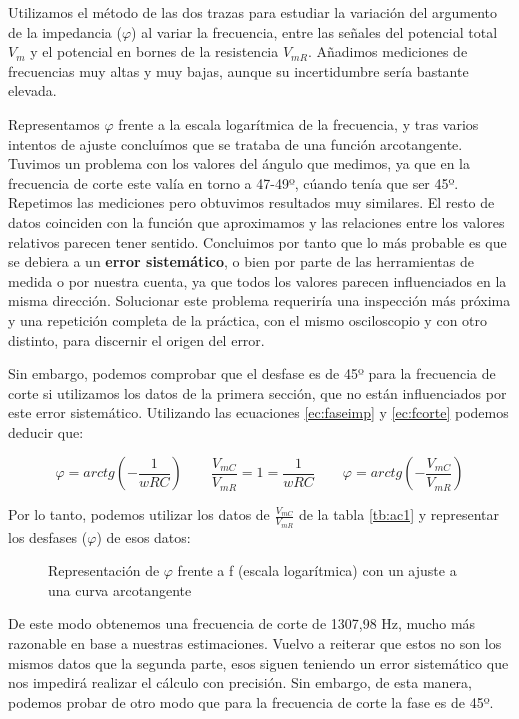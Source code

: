 \documentclass[12pt, a4paper, titlepage]{article}
\begin{document}
  Utilizamos el método de las dos trazas para estudiar la variación del argumento de la impedancia ($\varphi$) al variar la frecuencia, entre las señales del potencial total $V_m$ y el potencial en bornes de la resistencia $V_{mR}$. Añadimos mediciones de frecuencias muy altas y muy bajas, aunque su incertidumbre sería bastante elevada.

  Representamos $\varphi$ frente a la escala logarítmica de la frecuencia, y tras varios intentos de ajuste concluímos que se trataba de una función arcotangente. Tuvimos un problema con los valores del ángulo que medimos, ya que en la frecuencia de corte este valía en torno a 47-49º, cúando tenía que ser 45º. Repetimos las mediciones pero obtuvimos resultados muy similares. El resto de datos coinciden con la función que aproximamos y las relaciones entre los valores relativos parecen tener sentido. Concluimos por tanto que lo más probable es que se debiera a un \textbf{error sistemático}, o bien por parte de las herramientas de medida o por nuestra cuenta, ya que todos los valores parecen influenciados en la misma dirección. Solucionar este problema requeriría una inspección más próxima y una repetición completa de la práctica, con el mismo osciloscopio y con otro distinto, para discernir el origen del error.

  Sin embargo, podemos comprobar que el desfase es de 45º para la frecuencia de corte si utilizamos los datos de la primera sección, que no están influenciados por este error sistemático. Utilizando las ecuaciones \ref{ec:faseimp} y \ref{ec:fcorte} podemos deducir que:

  \begin{equation}
    \varphi = arctg\left(-\frac{1}{wRC}\right) \qquad \frac{V_{mC}}{V_{mR}} = 1 = \frac{1}{wRC} \qquad \varphi = arctg\left(-\frac{V_{mC}}{{V_{mR}}}\right) \nonumber
  \end{equation}

  Por lo tanto, podemos utilizar los datos de $\frac{V_{mC}}{V_{mR}}$ de la tabla \ref{tb:ac1} y representar los desfases ($\varphi$) de esos datos:

  \begin{figure}[H]
    \hspace{2.5em} 
    \caption{Representación de $\varphi$ frente a f (escala logarítmica) con un ajuste a una curva arcotangente}
  \end{figure}

  De este modo obtenemos una frecuencia de corte de 1307,98 Hz, mucho más razonable en base a nuestras estimaciones. Vuelvo a reiterar que estos no son los mismos datos que la segunda parte, esos siguen teniendo un error sistemático que nos impedirá realizar el cálculo con precisión. Sin embargo, de esta manera, podemos probar de otro modo que para la frecuencia de corte la fase es de 45º.
\end{document}
